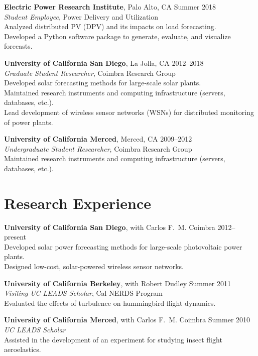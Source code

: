\documentclass[10pt]{res}
\begin{document}
\begin{resume}
\textbf{Electric Power Research Institute}, Palo Alto, CA \hfill Summer 2018 \\
\textit{Student Employee}, Power Delivery and Utilization \\
Analyzed distributed PV (DPV) and its impacts on load forecasting. \\
Developed a Python software package to generate, evaluate, and visualize forecasts.

\textbf{University of California San Diego}, La Jolla, CA \hfill 2012--2018 \\
\textit{Graduate Student Researcher}, Coimbra Research Group \\
Developed solar forecasting methods for large-scale solar plants. \\
Maintained research instruments and computing infrastructure (servers, databases, etc.). \\
Lead development of wireless sensor networks (WSNs) for distributed monitoring of power plants.

\textbf{University of California Merced}, Merced, CA \hfill 2009--2012 \\
\textit{Undergraduate Student Researcher}, Coimbra Research Group \\
Maintained research instruments and computing infrastructure (servers, databases, etc.).


\section{Research Experience}
\vspace{0.1in}

\textbf{University of California San Diego}, with Carlos F.~M. Coimbra \hfill 2012--present\\
Developed solar power forecasting methods for large-scale photovoltaic power plants. \\
Designed low-cost, solar-powered wireless sensor networks.

\textbf{University of California Berkeley}, with Robert Dudley \hfill Summer 2011 \\
\textit{Visiting UC LEADS Scholar}, Cal NERDS Program \\
Evaluated the effects of turbulence on hummingbird flight dynamics.

\textbf{University of California Merced}, with Carlos F.~M. Coimbra \hfill Summer 2010 \\
\textit{UC LEADS Scholar} \\
Assisted in the development of an experiment for studying insect flight aeroelastics.



\end{resume}
\end{document}
